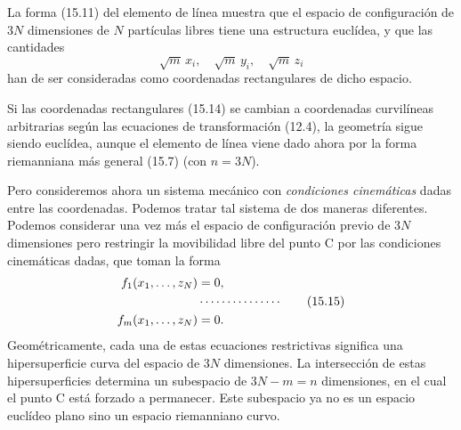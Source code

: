 \documentclass[12pt,a4paper]{book}
\begin{document}
\begin{center}
La forma (15.11) del elemento de l\'inea muestra que el espacio de configuraci\'on de $3N$ dimensiones de $N$ part\'iculas libres tiene una estructura eucl\'idea, y que las cantidades
\begin{equation}
\sqrt{m}\,x_i,\quad \sqrt{m}\,y_i,\quad \sqrt{m}\,z_i
\tag{15.14}
\end{equation}
han de ser consideradas como coordenadas rectangulares de dicho espacio.

Si las coordenadas rectangulares (15.14) se cambian a coordenadas curvil\'ineas arbitrarias seg\'un las ecuaciones de transformaci\'on (12.4), la geometr\'ia sigue siendo eucl\'idea, aunque el elemento de l\'inea viene dado ahora por la forma riemanniana m\'as general (15.7) (con $n = 3N$).

Pero consideremos ahora un sistema mec\'anico con \textit{condiciones cinem\'aticas} dadas entre las coordenadas. Podemos tratar tal sistema de dos maneras diferentes. Podemos considerar una vez m\'as el espacio de configuraci\'on previo de $3N$ dimensiones pero restringir la movibilidad libre del punto C por las condiciones cinem\'aticas dadas, que toman la forma
\begin{align}
f_1(x_1, \ldots, z_N) &= 0, \notag\\
&\cdots\cdots\cdots\cdots\cdots \tag{15.15}\\
f_m(x_1, \ldots, z_N) &= 0. \notag
\end{align}
Geom\'etricamente, cada una de estas ecuaciones restrictivas significa una hipersuperficie curva del espacio de $3N$ dimensiones. La intersecci\'on de estas hipersuperficies determina un subespacio de $3N - m = n$ dimensiones, en el cual el punto C est\'a forzado a permanecer. Este subespacio ya no es un espacio eucl\'ideo plano sino un espacio riemanniano curvo.


\end{center}
\end{document}
